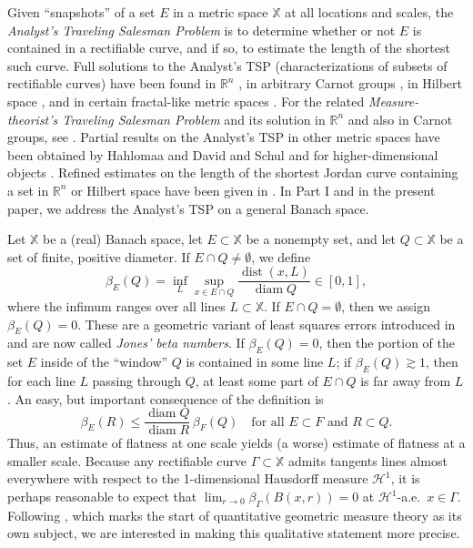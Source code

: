 \documentclass[12pt]{amsart}
\numberwithin{equation}{section}
\theoremstyle{plain}
\theoremstyle{definition}
\def\RR{\mathbb{R}}
\def\XX{{\mathbb{X}}}
\newcommand{\diam}{\mathop\mathrm{diam}\nolimits}
\newcommand{\dist}{\mathop\mathrm{dist}\nolimits}
\newcommand{\Haus}{\mathcal{H}}
\numberwithin{figure}{section}
\begin{document}
Given ``snapshots'' of a set $E$ in a metric space $\XX$ at all locations and scales, the \emph{Analyst's Traveling Salesman Problem} is to determine whether or not $E$ is contained in a rectifiable curve, and if so, to estimate the length of the shortest such curve. Full solutions to the Analyst's TSP (characterizations of subsets of rectifiable curves) have been found in $\RR^n$ \cite{Jones-TST,Ok-TST}, in arbitrary Carnot groups \cite{Li-TSP}, in Hilbert space \cite{Schul-Hilbert}, and in certain fractal-like metric spaces \cite{Guy-Schul}. For the related \emph{Measure-theorist's Traveling Salesman Problem} and its solution in $\RR^n$ and also in Carnot groups, see \cite{BS3,Badger-survey,BLZ}. Partial results on the Analyst's TSP in other metric spaces have been obtained by Hahlomaa \cite{Hah05,Hah08} and David and Schul \cite{DS-metric} and for higher-dimensional objects \cite{AS-TST,BNV,Hyde-TST,Villa-TST}. Refined estimates on the length of the shortest Jordan curve containing a set in $\RR^n$ or Hilbert space have been given in \cite{Bishop-TST,Krandel-Hilbert}. In Part I \cite{Badger-McCurdy-1} and in the present paper, we address the Analyst's TSP on a general Banach space.

Let $\XX$ be a (real) Banach space, let $E\subset \XX$ be a nonempty set, and let $Q\subset\XX$ be a set of finite, positive diameter. If $E\cap Q\neq \emptyset$, we define \begin{equation}\label{def:beta} \beta_E(Q) = \inf_{L} \sup_{x\in E\cap Q}\frac{\dist(x,L)}{\diam Q}\in[0,1],\end{equation} where the infimum ranges over all lines $L\subset \XX$. If $E\cap Q=\emptyset$, then we assign $\beta_E(Q)=0$. These are a geometric variant of least squares errors introduced in \cite{Jones-TST} and are now called \emph{Jones' beta numbers}. If $\beta_E(Q)=0$, then the portion of the set $E$ inside of the ``window'' $Q$ is contained in some line $L$; if $\beta_E(Q) \gtrsim 1$, then for each line $L$ passing through $Q$, at least some part of $E\cap Q$ is far away from $L$. An easy, but important consequence of the definition is \begin{equation} \label{beta-monotone} \beta_E(R) \leq \frac{\diam Q}{\diam R}\, \beta_F(Q)\quad\text{for all }E\subset F\text{ and }R\subset Q.\end{equation} Thus, an estimate of flatness at one scale yields (a worse) estimate of flatness at a smaller scale. Because any rectifiable curve $\Gamma\subset\XX$ admits tangents lines almost everywhere with respect to the 1-dimensional Hausdorff measure $\mathcal{H}^1$, it is perhaps reasonable to expect that $\lim_{r\rightarrow 0}\beta_{\Gamma}(B(x,r))=0$ at $\Haus^1$-a.e.~$x\in\Gamma$. Following \cite{Jones-TST}, which marks the start of quantitative geometric measure theory as its own subject, we are interested in making this qualitative statement more precise.
\end{document}
